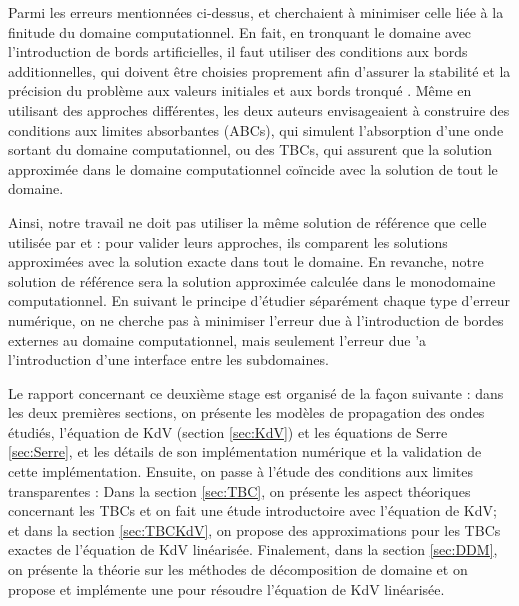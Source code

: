 \indent Parmi les erreurs mentionnées ci-dessus, \cite{zheng2008} et \cite{besse2015} cherchaient à minimiser celle liée à la finitude du domaine computationnel. En fait, en tronquant le domaine avec l'introduction de bords artificielles, il faut utiliser des conditions aux bords additionnelles, qui doivent être choisies proprement afin d'assurer la stabilité et la précision du problème aux valeurs initiales et aux bords tronqué \cite{zheng2008}. Même en utilisant des approches différentes, les deux auteurs envisageaient à construire des conditions aux limites absorbantes (ABCs), qui simulent l'absorption d'une onde sortant du domaine computationnel, ou des TBCs, qui assurent que la solution approximée dans le domaine computationnel coïncide avec la solution de tout le domaine.

\indent Ainsi, notre travail ne doit pas utiliser la même solution de référence que celle utilisée par \cite{zheng2008} et \cite{besse2015} : pour valider leurs approches, ils comparent les solutions approximées avec la solution exacte dans tout le domaine. En revanche, notre solution de référence sera la solution approximée calculée dans le monodomaine computationnel. En suivant le principe d'étudier séparément chaque type d'erreur numérique, on ne cherche pas à minimiser l'erreur due à l'introduction de bordes externes au domaine computationnel, mais seulement l'erreur due 'a l'introduction d'une interface entre les subdomaines.

\indent

\indent Le rapport concernant ce deuxième stage est organisé de la façon suivante : dans les deux premières sections, on présente les modèles de propagation des ondes étudiés, l'équation de KdV (section \ref{sec:KdV}) et les équations de Serre \ref{sec:Serre}, et les détails de son implémentation numérique et la validation de cette implémentation. Ensuite, on passe à l'étude des conditions aux limites transparentes :  Dans la section \ref{sec:TBC}, on présente les aspect théoriques concernant les TBCs et on fait une étude introductoire avec l'équation de KdV; et dans la section \ref{sec:TBCKdV}, on propose des approximations pour les TBCs exactes de l'équation de KdV linéarisée. Finalement, dans la section \ref{sec:DDM}, on présente la théorie sur les méthodes de décomposition de domaine et on propose et implémente une pour résoudre l'équation de KdV linéarisée.